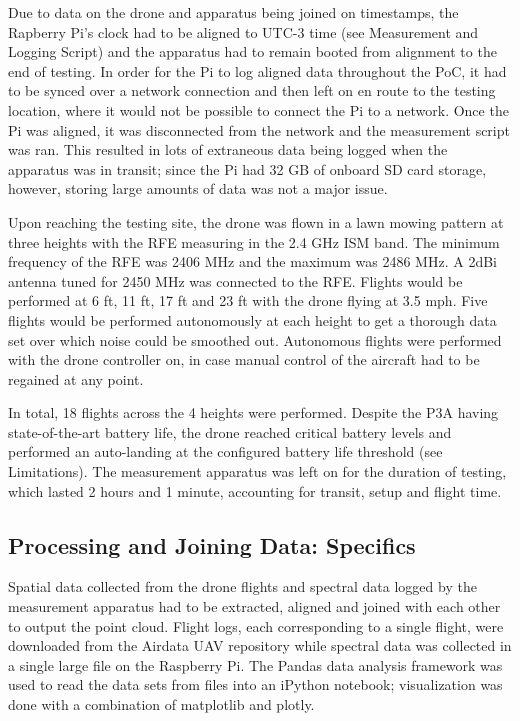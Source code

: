 \documentclass[pageno]{jpaper}
\begin{document}
Due to data on the drone and apparatus being joined on timestamps, the Rapberry Pi's clock had to be aligned to UTC-3 time (see Measurement and Logging Script) and the apparatus had to remain booted from alignment to the end of testing. In order for the Pi to log aligned data throughout the PoC, it had to be synced over a network connection and then left on en route to the testing location, where it would not be possible to connect the Pi to a network. Once the Pi was aligned, it was disconnected from the network and the measurement script was ran. This resulted in lots of extraneous data being logged when the apparatus was in transit; since the Pi had 32 GB of onboard SD card storage, however, storing large amounts of data was not a major issue. 

Upon reaching the testing site, the drone was flown in a lawn mowing pattern at three heights with the RFE measuring in the 2.4 GHz ISM band. The minimum frequency of the RFE was 2406 MHz and the maximum was 2486 MHz. A 2dBi antenna tuned for 2450 MHz was connected to the RFE. Flights would be performed at 6 ft, 11 ft, 17 ft and 23 ft with the drone flying at 3.5 mph. Five flights would be performed autonomously at each height to get a thorough data set over which noise could be smoothed out. Autonomous flights were performed with the drone controller on, in case manual control of the aircraft had to be regained at any point.

In total, 18 flights across the 4 heights were performed. Despite the P3A having state-of-the-art battery life, the drone reached critical battery levels and performed an auto-landing at the configured battery life threshold (see Limitations). The measurement apparatus was left on for the duration of testing, which lasted 2 hours and 1 minute, accounting for transit, setup and flight time. 

\subsection{Processing and Joining Data: Specifics}

Spatial data collected from the drone flights and spectral data logged by the measurement apparatus had to be extracted, aligned and joined with each other to output the point cloud. Flight logs, each corresponding to a single flight, were downloaded from the Airdata UAV repository while spectral data was collected in a single large file on the Raspberry Pi. The Pandas data analysis framework was used to read the data sets from files into an iPython notebook; visualization was done with a combination of matplotlib and plotly.
\end{document}
